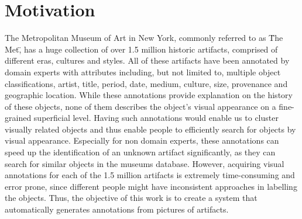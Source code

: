 \section{Motivation}
The Metropolitan Museum of Art in New York, commonly referred to as \"The Met\", has a huge collection of over 1.5 million historic artifacts, comprised of different eras, cultures and styles.
All of these artifacts have been annotated by domain experts with attributes including, but not limited to, multiple object classifications, artist, title, period, date, medium, culture, size, provenance and geographic location.
While these annotations provide explanation on the history of these objects, none of them describes the object's visual appearance on a fine-grained superficial level.
Having such annotations would enable us to cluster visually related objects and thus enable people to efficiently search for objects by visual appearance.
Especially for non domain experts, these annotations can speed up the identification of an unknown artifact significantly, as they can search for similar objects in the museums database.
However, acquiring visual annotations for each of the 1.5 million artifacts is extremely time-consuming and error prone, since different people might have inconsistent approaches in labelling the objects.
Thus, the objective of this work is to create a system that automatically generates annotations from pictures of artifacts.


